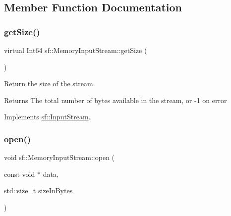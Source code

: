 \subsection{Member Function Documentation}
\mbox{\label{classsf_1_1_memory_input_stream_a6ade3ca45de361ffa0a718595f0b6763}} 
\subsubsection{\texorpdfstring{getSize()}{getSize()}}
{\footnotesize\ttfamily virtual Int64 sf\+::\+Memory\+Input\+Stream\+::get\+Size (\begin{DoxyParamCaption}{ }\end{DoxyParamCaption})\hspace{0.3cm}{\ttfamily [virtual]}}



Return the size of the stream. 

\begin{DoxyReturn}{Returns}
The total number of bytes available in the stream, or -\/1 on error \begin{DoxyVerb}\end{DoxyVerb}
 
\end{DoxyReturn}


Implements \mbox{\hyperlink{classsf_1_1_input_stream_a311eaaaa65d636728e5153b574b72d5d}{sf\+::\+Input\+Stream}}.

\mbox{\label{classsf_1_1_memory_input_stream_ad3cfb4f4f915f7803d6a0784e394ac19}} 
\subsubsection{\texorpdfstring{open()}{open()}}
{\footnotesize\ttfamily void sf\+::\+Memory\+Input\+Stream\+::open (\begin{DoxyParamCaption}\item[{const void $\ast$}]{data,  }\item[{std\+::size\+\_\+t}]{size\+In\+Bytes }\end{DoxyParamCaption})}




